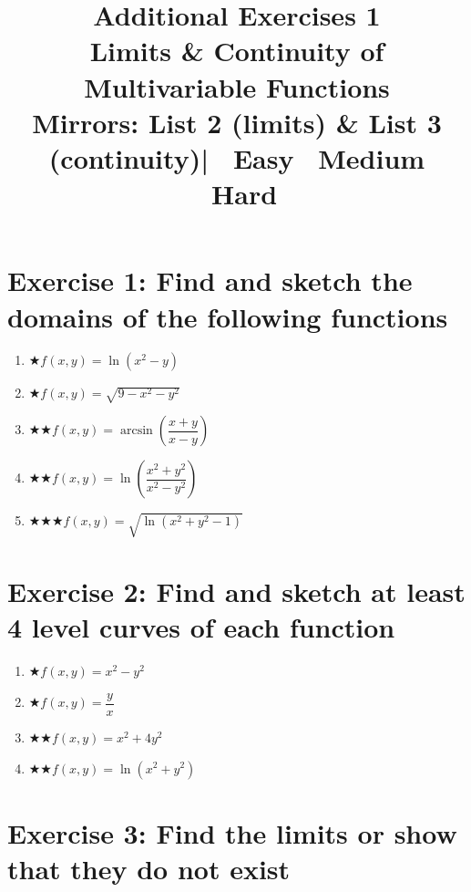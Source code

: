 \documentclass[12pt,a4paper]{article}
\title{\textbf{Additional Exercises 1}\\
\large Limits \& Continuity of Multivariable Functions\\[4pt]
\normalsize Mirrors: List 2 (limits) \& List 3 (continuity)\quad|\quad
\easy\ Easy \quad \medium\ Medium \quad \hard\ Hard}
\date{}
\newcommand{\easy}{{\color{green!60!black}$\bigstar$}}
\newcommand{\medium}{{\color{orange}$\bigstar\bigstar$}}
\newcommand{\hard}{{\color{red}$\bigstar\bigstar\bigstar$}}
\begin{document}
\maketitle
\thispagestyle{empty}

\section*{Exercise 1: Find and sketch the domains of the following functions}

\begin{enumerate}[leftmargin=*, label=(\alph*)]
\item \easy\quad $f(x,y) = \ln(x^2 - y)$
\item \easy\quad $f(x,y) = \sqrt{9 - x^2 - y^2}$
\item \medium\quad $f(x,y) = \arcsin\!\left(\dfrac{x+y}{x-y}\right)$
\item \medium\quad $f(x,y) = \ln\!\left(\dfrac{x^2+y^2}{x^2-y^2}\right)$
\item \hard\quad $f(x,y) = \sqrt{\ln(x^2+y^2-1)}$
\end{enumerate}

\section*{Exercise 2: Find and sketch at least 4 level curves of each function}

\begin{enumerate}[leftmargin=*, label=(\alph*)]
\item \easy\quad $f(x,y) = x^2 - y^2$
\item \easy\quad $f(x,y) = \dfrac{y}{x}$
\item \medium\quad $f(x,y) = x^2 + 4y^2$
\item \medium\quad $f(x,y) = \ln(x^2+y^2)$
\end{enumerate}

\section*{Exercise 3: Find the limits or show that they do not exist}
\end{document}
